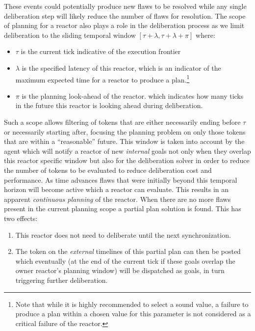 These events could potentially produce new flaws to be resolved while
any single deliberation step will likely reduce the number of flaws
for resolution. The scope of planning for a reactor also plays a role
in the deliberation process as we limit deliberation to the sliding
temporal window $[\tau+\lambda, \tau+\lambda+\pi]$ \cite{py10} where:

\begin{itemize}

\item $\tau$ is the current tick indicative of the execution frontier 

\item $\lambda$ is the specified latency of this reactor, which is an
  indicator of the maximum expected time for a reactor to produce a
  plan.\footnote{Note that while it is highly recommended to select a
    sound value, a failure to produce a plan within a chosen value for
    this parameter is not considered as a critical failure of the
    reactor.}

\item $\pi$ is the planning look-ahead of the reactor. which indicates
  how many ticks in the future this reactor is looking ahead during
  deliberation. 

\end{itemize}

 Such a
scope allows filtering of tokens that are either necessarily ending
before $\tau$ or necessarily starting after, focusing the planning
problem on only those tokens that are within a ``reasonable''
future. This window is taken into account by the \rx agent which will
notify a reactor of new {\em internal} goals not only when they
overlap this reactor specific window but also for the deliberation
solver in order to reduce the number of tokens to be evaluated to
reduce deliberation cost and performance. As time advances flaws that
were initially beyond this temporal horizon will become active which a
reactor can evaluate. This results in an apparent \emph{continuous
  planning} of the reactor. When there are no more flaws present in
the current planning scope a partial plan solution is found. This has
two effects:

\begin{enumerate}

\item This reactor does not need to deliberate until the next
  synchronization. 

\item The token on the {\em external} timelines of this partial plan
  can then be posted which eventually (at the end of the current tick
  if these goals overlap the owner reactor's planning window) will be
  dispatched as goals, in turn triggering further deliberation.

\end{enumerate}


